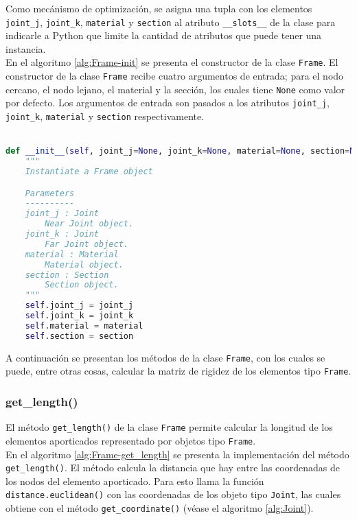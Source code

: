 Como mecánismo de optimización, se asigna una tupla con los elementos \verb|joint_j|, \verb|joint_k|, \verb|material| y \verb|section| al atributo \verb|__slots__| de la clase para indicarle a Python que limite la cantidad de atributos que puede tener una instancia.\\

En el algoritmo \ref{alg:Frame-init} se presenta el constructor de la clase \verb|Frame|. El constructor de la clase \verb|Frame| recibe cuatro argumentos de entrada; para el nodo cercano, el nodo lejano, el material y la sección, los cuales tiene \verb|None| como valor por defecto. Los argumentos de entrada son pasados a los atributos \verb|joint_j|, \verb|joint_k|, \verb|material| y \verb|section| respectivamente.\\\

\begin{lstlisting}[language=Python,caption=Constructor de la clase \texttt{Frame}.,label=alg:Frame-init, frame=single]
def __init__(self, joint_j=None, joint_k=None, material=None, section=None):
    """
    Instantiate a Frame object

    Parameters
    ----------
    joint_j : Joint
        Near Joint object.
    joint_k : Joint
        Far Joint object.
    material : Material
        Material object.
    section : Section
        Section object.
    """
    self.joint_j = joint_j
    self.joint_k = joint_k
    self.material = material
    self.section = section
\end{lstlisting}
\bigskip
A continuación se presentan los métodos de la clase \verb|Frame|, con los cuales se puede, entre otras cosas, calcular la matriz de rigidez de los elementos tipo \verb|Frame|.\\

\subsubsection{get\_length()}
El método \verb|get_length()| de la clase \verb|Frame| permite calcular la longitud de los elementos aporticados representado por objetos tipo \verb|Frame|.\\

En el algoritmo \ref{alg:Frame-get_length} se presenta la implementación del método \verb|get_length()|. El método calcula la distancia que hay entre las coordenadas de los nodos del elemento aporticado. Para esto llama la función \verb|distance.euclidean()| con las coordenadas de los objeto tipo \verb|Joint|, las cuales obtiene con el método \verb|get_coordinate()| (véase el algoritmo \ref{alg:Joint}).\\


